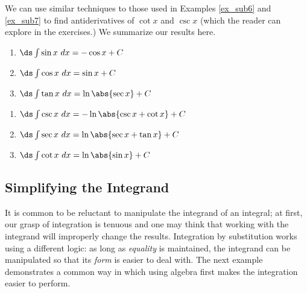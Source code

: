 We can use similar techniques to those used in Examples \ref{ex_sub6} and \ref{ex_sub7} to find antiderivatives of $\cot x$ and $\csc x$ (which the reader can explore in the exercises.) We summarize our results here.

\setboxwidth{20pt}
{\begin{minipage}{.45\specialboxlength}\small{}
	\begin{enumerate}
	\item	$\ds \int \sin x \ dx = -\cos x +C$
	\item	$\ds\int \cos x\ dx = \sin x + C$
	\item	$\ds \int \tan x\ dx = \ln\abs{\sec x}+C$
\end{enumerate}
\end{minipage}%
\begin{minipage}{.55\specialboxlength}\small
	\begin{enumerate}\addtocounter{enumi}{3}
	\item	$\ds \int \csc x \ dx = -\ln\abs{\csc x+\cot x} +C$
	\item	$\ds\int \sec x\ dx = \ln\abs{\sec x+\tan x} + C$
	\item	$\ds \int \cot x\ dx = \ln\abs{\sin x}+C$
\end{enumerate}
\end{minipage}}


\subsection*{Simplifying the Integrand}

It is common to be reluctant to manipulate the integrand of an integral; at first, our grasp of integration is tenuous and one may think that working with the integrand will improperly change the results. Integration by substitution works using a different logic: as long as \textit{equality} is maintained, the integrand can be manipulated so that its \textit{form} is easier to deal with. The next example demonstrates a common way in which using algebra first makes the integration easier to perform.

